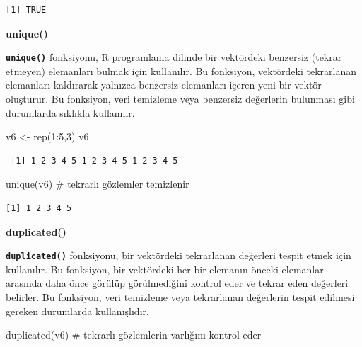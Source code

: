 \documentclass[
  letterpaper,
  DIV=11,
  numbers=noendperiod]{scrreprt}
\newenvironment{Shaded}{\begin{snugshade}}{\end{snugshade}}
\newcommand{\CommentTok}[1]{\textcolor[rgb]{0.37,0.37,0.37}{#1}}
\newcommand{\DecValTok}[1]{\textcolor[rgb]{0.68,0.00,0.00}{#1}}
\newcommand{\FunctionTok}[1]{\textcolor[rgb]{0.28,0.35,0.67}{#1}}
\newcommand{\NormalTok}[1]{\textcolor[rgb]{0.00,0.23,0.31}{#1}}
\newcommand{\OtherTok}[1]{\textcolor[rgb]{0.00,0.23,0.31}{#1}}
\newcommand{\SpecialCharTok}[1]{\textcolor[rgb]{0.37,0.37,0.37}{#1}}
\begin{document}
\begin{verbatim}
[1] TRUE
\end{verbatim}

\textbf{unique()}

\textbf{\texttt{unique()}} fonksiyonu, R programlama dilinde bir
vektördeki benzersiz (tekrar etmeyen) elemanları bulmak için kullanılır.
Bu fonksiyon, vektördeki tekrarlanan elemanları kaldırarak yalnızca
benzersiz elemanları içeren yeni bir vektör oluşturur. Bu fonksiyon,
veri temizleme veya benzersiz değerlerin bulunması gibi durumlarda
sıklıkla kullanılır.

\begin{Shaded}
\begin{Highlighting}[]
\NormalTok{v6 }\OtherTok{\textless{}{-}} \FunctionTok{rep}\NormalTok{(}\DecValTok{1}\SpecialCharTok{:}\DecValTok{5}\NormalTok{,}\DecValTok{3}\NormalTok{)}
\NormalTok{v6}
\end{Highlighting}
\end{Shaded}

\begin{verbatim}
 [1] 1 2 3 4 5 1 2 3 4 5 1 2 3 4 5
\end{verbatim}

\begin{Shaded}
\begin{Highlighting}[]
\FunctionTok{unique}\NormalTok{(v6) }\CommentTok{\# tekrarlı gözlemler temizlenir}
\end{Highlighting}
\end{Shaded}

\begin{verbatim}
[1] 1 2 3 4 5
\end{verbatim}

\textbf{duplicated()}

\textbf{\texttt{duplicated()}} fonksiyonu, bir vektördeki tekrarlanan
değerleri tespit etmek için kullanılır. Bu fonksiyon, bir vektördeki her
bir elemanın önceki elemanlar arasında daha önce görülüp görülmediğini
kontrol eder ve tekrar eden değerleri belirler. Bu fonksiyon, veri
temizleme veya tekrarlanan değerlerin tespit edilmesi gereken durumlarda
kullanışlıdır.

\begin{Shaded}
\begin{Highlighting}[]
\FunctionTok{duplicated}\NormalTok{(v6) }\CommentTok{\# tekrarlı gözlemlerin varlığını kontrol eder}
\end{Highlighting}
\end{Shaded}
\end{document}
